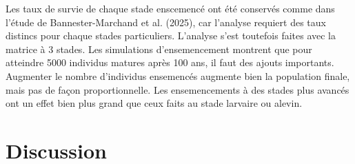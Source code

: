 \documentclass[9pt,twocolumn,twoside,]{pnas-new}
\begin{document}
Les taux de survie de chaque stade enscemencé ont été conservés comme
dans l'étude de Bannester-Marchand et al. (2025), car l'analyse requiert
des taux distincs pour chaque stades particuliers. L'analyse s'est
toutefois faites avec la matrice à 3 stades. Les simulations
d'ensemencement montrent que pour atteindre 5000 individus matures après
100 ans, il faut des ajouts importants. Augmenter le nombre d'individus
ensemencés augmente bien la population finale, mais pas de façon
proportionnelle. Les ensemencements à des stades plus avancés ont un
effet bien plus grand que ceux faits au stade larvaire ou alevin.

\section*{Discussion}\label{discussion}
\end{document}

